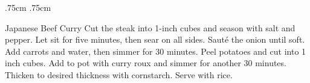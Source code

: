 \documentclass[]{article}
\title{}
\author{}
\begin{document}
\RecipeWidths{\textwidth}{3cm}{0.5cm}{5cm} {.75cm} {.75cm}
\begin{recipe}{Japanese Beef Curry}{}{}	
	Cut the steak into 1-inch cubes and season with salt and pepper. Let sit for five minutes, then sear on all sides. 
	Sauté the onion until soft. 
	Add carrots and water, then simmer for 30 minutes. 
	Peel potatoes and cut into 1 inch cubes. Add to pot with curry roux and simmer for another 30 minutes. Thicken to desired thickness with cornstarch.
	Serve with rice. 

\end{recipe}
\end{document}
